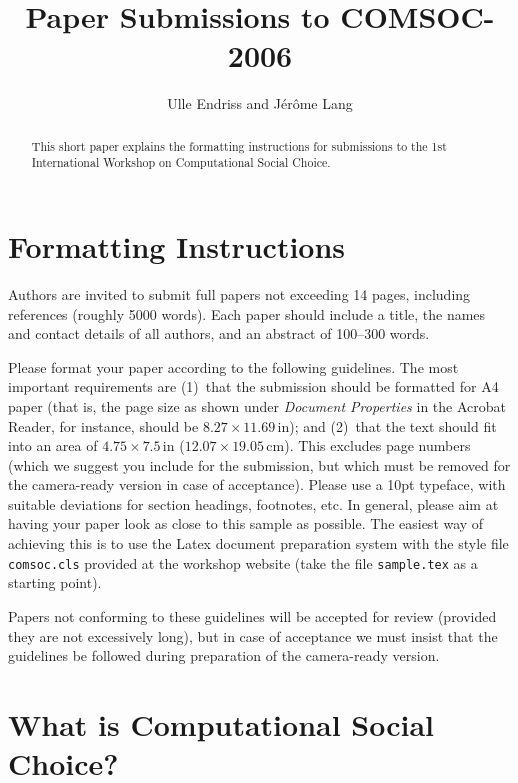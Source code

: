 \documentclass{comsoc}
\title{\bf Paper Submissions to COMSOC-2006}
\author{Ulle Endriss and J\'er\^ome Lang}
\begin{document}

\begin{abstract}
This short paper explains the formatting instructions for submissions
to the 1st International Workshop on Computational Social Choice.
\end{abstract}


\section{Formatting Instructions}

Authors are invited to submit full papers not exceeding 14 pages, 
including references (roughly 5000 words). Each paper should include 
a title, the names and contact details of all authors, and an abstract 
of 100--300 words.

Please format your paper according to the following guidelines.
The most important requirements are (1)~that the submission should be 
formatted for A4 paper (that is, the page size as shown under 
\emph{Document Properties} in the Acrobat Reader, for instance, should 
be $8.27\times 11.69\,\mbox{in}$); and (2)~that the text should fit into 
an area of $4.75\times 7.5\,\mbox{in}$ ($12.07\times 19.05\,\mbox{cm}$). 
This excludes page numbers (which we suggest you include for the 
submission, but which must be removed for the camera-ready version in 
case of acceptance). Please use a 10pt typeface, with suitable deviations
for section headings, footnotes, etc. In general, please aim at having 
your paper look as close to this sample as possible. The easiest way of 
achieving this is to use the Latex document preparation system with the 
style file \texttt{comsoc.cls} provided at the workshop  website (take 
the file \texttt{sample.tex} as a starting point).

Papers not conforming to these guidelines will be accepted for review
(provided they are not excessively long), but in case of acceptance we
must insist that the guidelines be followed during preparation of the 
camera-ready version.  

\section{What is Computational Social Choice?}
\end{document}

